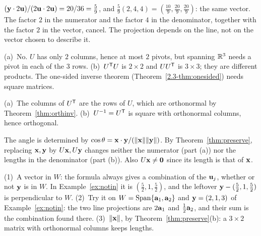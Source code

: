\documentclass[11pt]{article}
\begin{document}
\begin{description}[leftmargin=0pt,itemsep=5pt]
  \item[Pause and think \ref{think:scaleproj}.] $(\mathbf{y}\cdot2\mathbf{u})/(2\mathbf{u}\cdot2\mathbf{u})=20/36=\tfrac59$, and $\tfrac59(2,4,4)=(\tfrac{10}{9},\tfrac{20}{9},\tfrac{20}{9})$: the same vector. The factor $2$ in the numerator and the factor $4$ in the denominator, together with the factor $2$ in the vector, cancel. The projection depends on the line, not on the vector chosen to describe it.
  \item[Pause and think \ref{think:nonsquare}.] (a)~No. $U$ has only $2$ columns, hence at most $2$ pivots, but spanning $\mathbb{R}^3$ needs a pivot in each of the $3$ rows. (b)~$U^{\mathsf T} U$ is $2\times2$ and $UU^{\mathsf T}$ is $3\times3$; they are different products. The one-sided inverse theorem (Theorem~\ref{2.3-thm:onesided}) needs square matrices.
  \item[Pause and think \ref{think:rowscols}.] (a)~The columns of $U^{\mathsf T}$ are the rows of $U$, which are orthonormal by Theorem~\ref{thm:orthinv}. (b)~$U^{-1}=U^{\mathsf T}$ is square with orthonormal columns, hence orthogonal.
  \item[Pause and think \ref{think:angles}.] The angle is determined by $\cos\theta=\mathbf{x}\cdot\mathbf{y}/(\lVert\mathbf{x}\rVert\lVert\mathbf{y}\rVert)$. By Theorem~\ref{thm:preserve}, replacing $\mathbf{x},\mathbf{y}$ by $U\mathbf{x},U\mathbf{y}$ changes neither the numerator (part (a)) nor the lengths in the denominator (part (b)). Also $U\mathbf{x}\neq\mathbf{0}$ since its length is that of $\mathbf{x}$.
  \item[Questions to think about.] (1)~A vector in $W$: the formula always gives a combination of the $\mathbf{u}_j$, whether or not $\mathbf{y}$ is in $W$. In Example~\ref{ex:notin} it is $(\tfrac52,1,\tfrac52)$, and the leftover $\mathbf{y}-(\tfrac52,1,\tfrac52)$ is perpendicular to $W$. (2)~Try it on $W=\operatorname{Span}\{\mathbf{a}_1,\mathbf{a}_2\}$ and $\mathbf{y}=(2,1,3)$ of Example~\ref{ex:notin}: the two line projections are $2\mathbf{a}_1$ and $\tfrac12\mathbf{a}_2$, and their sum is the combination found there. (3)~$\lVert\mathbf{x}\rVert$, by Theorem~\ref{thm:preserve}(b): a $3\times2$ matrix with orthonormal columns keeps lengths.
\end{description}
\end{document}
